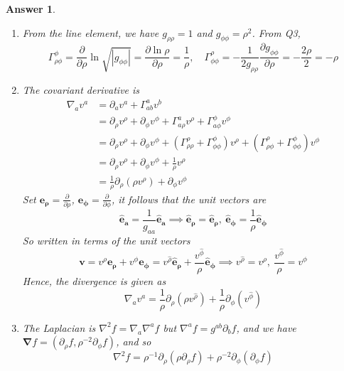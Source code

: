 \documentclass[a4paper]{article}
\newtheorem{ans}{Answer}[subsection]
\theoremstyle{new}
\begin{document}
\begin{ans}\leavevmode
\begin{enumerate}[label=(\alph*)]
\item From the line element, we have $g_{\rho\rho}=1$ and $g_{\phi\phi}=\rho^2$. From Q3, 
$$\Gamma_{\rho\phi}^\phi=\frac{\partial}{\partial\rho}\ln\sqrt{|g_{\phi\phi}|}=\frac{\partial\ln\rho}{\partial\rho}=\frac{1}{\rho},\quad\Gamma_{\phi\phi}^\rho=-\frac{1}{2g_{\rho\rho}}\frac{\partial g_{\phi\phi}}{\partial\rho}=-\frac{2\rho}{2}=-\rho$$
\item The covariant derivative is
\begin{align}
    \nabla_av^a&=\partial_av^a+\Gamma_{ab}^av^b\nonumber\\&=\partial_\rho v^\rho+\partial_\phi v^\phi+\Gamma_{a\rho}^av^\rho+\Gamma_{a\phi}^\phi v^\phi\nonumber\\&=\partial_\rho v^\rho+\partial_\phi v^\phi+(\Gamma_{\rho\rho}^\rho+\Gamma_{\phi\phi}^\phi)v^\rho+(\Gamma_{\rho\phi}^\rho+\Gamma_{\phi\phi}^\phi) v^\phi\nonumber\\&=\partial_\rho v^\rho+\partial_\phi v^\phi+\frac{1}{\rho}v^\rho\nonumber\\&=\frac{1}{\rho}\partial_\rho(\rho v^\rho)+\partial_\phi v^\phi\nonumber
\end{align}
Set $\boldsymbol{e_\rho}=\frac{\partial}{\partial\rho}$, $\boldsymbol{e_\phi}=\frac{\partial}{\partial\phi}$, it follows that the unit vectors are
$$\boldsymbol{\hat{e}_a}=\frac{1}{g_{aa}}\boldsymbol{\hat{e}_a}\implies\boldsymbol{\hat{e}_\rho}=\boldsymbol{\hat{e}_\rho},~\boldsymbol{\hat{e}_\phi}=\frac{1}{\rho}\boldsymbol{\hat{e}_\phi}$$
So written in terms of the unit vectors
$$\mathbf{v}=v^\rho\boldsymbol{e_\rho}+v^\phi\boldsymbol{e_\phi}=v^{\hat{\rho}}\boldsymbol{\hat{e}_\rho}+\frac{v^{\hat{\phi}}}{\rho}\boldsymbol{\hat{e}_\phi}\implies v^{\hat{\rho}}=v^\rho,~\frac{v^{\hat{\phi}}}{\rho}=v^\phi$$
Hence, the divergence is given as
$$\nabla_av^a=\frac{1}{\rho}\partial_\rho(\rho v^{\hat{\rho}})+\frac{1}{\rho}\partial_\phi(v^{\hat{\phi}})$$
\item The Laplacian is $\nabla^2f=\nabla_a\nabla^af$ but $\nabla^af=g^{ab}\partial_bf$, and we have $\boldsymbol{\nabla}f=(\partial_\rho f,\rho^{-2}\partial_\phi f)$, and so
$$\nabla^2f=\rho^{-1}\partial_\rho(\rho\partial_\rho f)+\rho^{-2}\partial_\phi(\partial_\phi f)$$
\end{enumerate}
\end{ans}
\newpage
\end{document}
